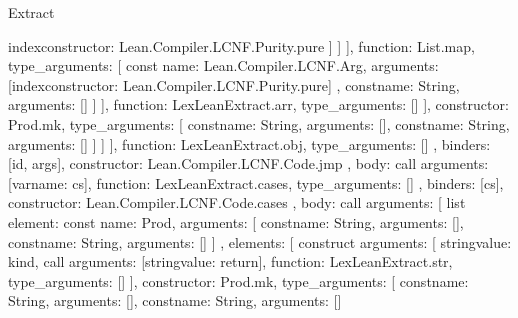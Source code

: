 \begin{lexlean}{Extract}
\begin{toolingmodule}
{{{{{{{{{{{                                        index{constructor: Lean.Compiler.LCNF.Purity.pure}
                                      ]
                                    }
                                  ]
                                }
                              ],
                              function: List.map,
                              type_arguments: [
                                const{
                                  name: Lean.Compiler.LCNF.Arg,
                                  arguments: [index{constructor: Lean.Compiler.LCNF.Purity.pure}]
                                },
                                const{name: String, arguments: []}
                              ]
                            }
                          ],
                          function: LexLeanExtract.arr,
                          type_arguments: []
                        }
                      ],
                      constructor: Prod.mk,
                      type_arguments: [
                        const{name: String, arguments: []},
                        const{name: String, arguments: []}
                      ]
                    }
                  ]
                }
              ],
              function: LexLeanExtract.obj,
              type_arguments: []
            },
            binders: [id, args],
            constructor: Lean.Compiler.LCNF.Code.jmp
          },
          {
            body: call{
              arguments: [var{name: cs}],
              function: LexLeanExtract.cases,
              type_arguments: []
            },
            binders: [cs],
            constructor: Lean.Compiler.LCNF.Code.cases
          },
          {
            body: call{
              arguments: [
                list{
                  element: const{
                    name: Prod,
                    arguments: [
                      const{name: String, arguments: []},
                      const{name: String, arguments: []}
                    ]
                  },
                  elements: [
                    construct{
                      arguments: [
                        string{value: kind},
                        call{
                          arguments: [string{value: return}],
                          function: LexLeanExtract.str,
                          type_arguments: []
                        }
                      ],
                      constructor: Prod.mk,
                      type_arguments: [
                        const{name: String, arguments: []},
                        const{name: String, arguments: []}
}}}}}}}
\end{toolingmodule}
\end{lexlean}
